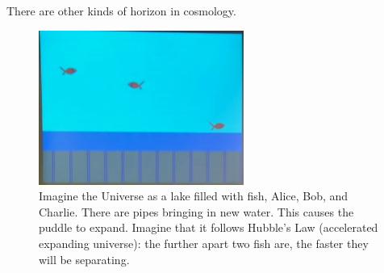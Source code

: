 \documentclass[]{article}
\begin{document}
There are other kinds of horizon in cosmology.

\begin{figure}[H]
	\begin{center}
		\caption[Imagine the Universe as a lake filled with fish]{Imagine the Universe as a lake filled with fish, Alice, Bob, and Charlie. There are pipes bringing in new water. This causes the puddle to expand. Imagine that it follows Hubble's Law (accelerated expanding universe): the further apart two fish are, the faster they will be separating. }
		\includegraphics[width=0.6\textwidth]{wh-cosmology-fish}
	\end{center}
\end{figure}
\end{document}
